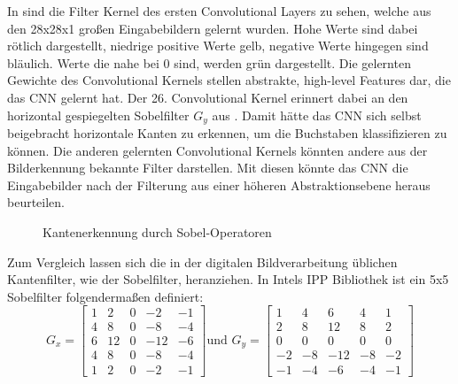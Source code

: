 \documentclass[runningheads,a4paper]{llncs}[2015/06/24]
\begin{document}
In  sind die Filter Kernel des ersten Convolutional Layers zu sehen, welche aus den 28x28x1 großen Eingabebildern gelernt wurden. Hohe Werte sind dabei rötlich dargestellt, niedrige positive Werte gelb, negative Werte hingegen sind bläulich. Werte die nahe bei 0 sind, werden grün dargestellt. Die gelernten Gewichte des Convolutional Kernels stellen abstrakte, high-level Features dar, die das CNN gelernt hat. Der 26. Convolutional Kernel erinnert dabei an den horizontal gespiegelten Sobelfilter $G_y$ aus . Damit hätte das CNN sich selbst beigebracht horizontale Kanten zu erkennen, um die Buchstaben klassifizieren zu können. Die anderen gelernten Convolutional Kernels könnten andere aus der Bilderkennung bekannte Filter darstellen. Mit diesen könnte das CNN die Eingabebilder nach der Filterung aus einer höheren Abstraktionsebene heraus beurteilen.
\begin{figure}
	\centering
	\caption{Kantenerkennung durch Sobel-Operatoren}
	\label{fig:sobel}
\end{figure}
Zum Vergleich lassen sich die in der digitalen Bildverarbeitung üblichen Kantenfilter, wie der Sobelfilter, heranziehen. In Intels IPP Bibliothek \cite{sobel} ist ein 5x5 Sobelfilter folgendermaßen definiert:
\[ G_{x}=
\begin{bmatrix}
1 & 2 & 0 & -2 & -1 \\
4 & 8 & 0 & -8 & -4 \\
6 & 12 & 0 & -12 & -6 \\
4 & 8 & 0 & -8 & -4 \\
1 & 2 & 0 & -2 & -1 
\end{bmatrix}
\text{und } G_{y}=
\begin{bmatrix}
1 & 4 & 6 & 4 & 1 \\
2 & 8 & 12 & 8 & 2 \\
0 & 0 & 0 & 0 & 0 \\
-2 & -8 & -12 & -8 & -2 \\
-1 & -4 & -6 & -4 & -1 
\end{bmatrix}
\]
\end{document}

